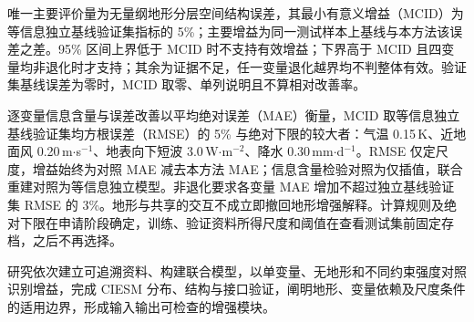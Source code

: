 唯一主要评价量为无量纲地形分层空间结构误差，其最小有意义增益（MCID）为等信息独立基线验证集指标的 5\%；主要增益为同一测试样本上基线与本方法该误差之差。95\% 区间上界低于 MCID 时不支持有效增益；下界高于 MCID 且四变量均非退化时才支持；其余为证据不足，任一变量退化越界均不判整体有效。验证集基线误差为零时，MCID 取零、单列说明且不算相对改善率。

逐变量信息含量与误差改善以平均绝对误差（MAE）衡量，MCID 取等信息独立基线验证集均方根误差（RMSE）的 5\% 与绝对下限的较大者：气温 0.15\,K、近地面风 0.20\,m$\cdot$s$^{-1}$、地表向下短波 3.0\,W$\cdot$m$^{-2}$、降水 0.30\,mm$\cdot$d$^{-1}$。RMSE 仅定尺度，增益始终为对照 MAE 减去本方法 MAE；信息含量检验对照为仅插值，联合重建对照为等信息独立模型。非退化要求各变量 MAE 增加不超过独立基线验证集 RMSE 的 3\%。地形与共享的交互不成立即撤回地形增强解释。计算规则及绝对下限在申请阶段确定，训练、验证资料所得尺度和阈值在查看测试集前固定存档，之后不再选择。

研究依次建立可追溯资料、构建联合模型，以单变量、无地形和不同约束强度对照识别增益，完成 CIESM 分布、结构与接口验证，阐明地形、变量依赖及尺度条件的适用边界，形成输入输出可检查的增强模块。

\printbibliography[heading=ciesm]
